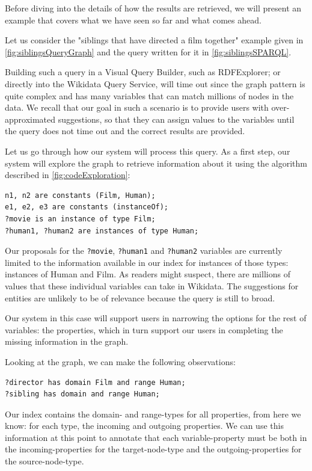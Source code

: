 Before diving into the details of how the results are retrieved, we will present an example that covers what we have seen so far and what comes ahead.

\begin{example}

Let us consider the "siblings that have directed a film together" example given in \autoref{fig:siblingsQueryGraph} and the query written for it in \autoref{fig:siblingsSPARQL}.

Building such a query in a Visual Query Builder, such as RDFExplorer; or directly into the Wikidata Query Service, will time out since the graph pattern is quite complex and has many variables that can match millions of nodes in the data. We recall that our goal in such a scenario is to provide users with over-approximated suggestions, so that they can assign values to the variables until the query does not time out and the correct results are provided.

Let us go through how our system will process this query. 
As a first step, our system will explore the graph to retrieve information about it using the algorithm described in \autoref{fig:codeExploration}:
\begin{verbatim}
n1, n2 are constants (Film, Human);
e1, e2, e3 are constants (instanceOf);
?movie is an instance of type Film;
?human1, ?human2 are instances of type Human;
\end{verbatim}

Our proposals for the \texttt{?movie}, \texttt{?human1} and \texttt{?human2} variables are currently limited to the information available in our index for instances of those types: instances of Human and Film. As readers might suspect, there are millions of values that these individual variables can take in Wikidata. The suggestions for entities are unlikely to be of relevance because the query is still to broad.

Our system in this case will support users in narrowing the options for the rest of variables: the properties, which in turn support our users in completing the missing information in the graph.

Looking at the graph, we can make the following observations:
\begin{verbatim}
?director has domain Film and range Human;
?sibling has domain and range Human;
\end{verbatim}

Our index contains the domain- and range-types for all properties, from here we know: for each type, the incoming and outgoing properties. 
We can use this information at this point to annotate that each variable-property must be both in the incoming-properties for the target-node-type and the outgoing-properties for the source-node-type.


\end{example}
